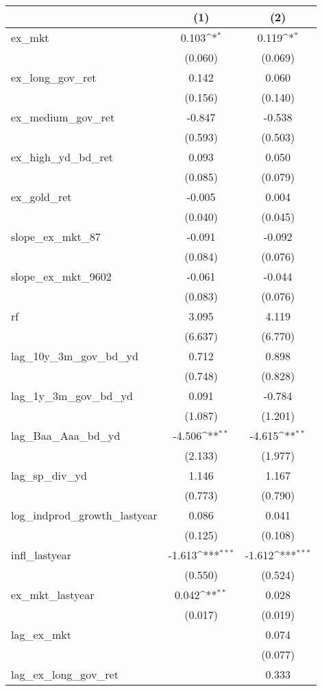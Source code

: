 {
\def\sym#1{\ifmmode^{#1}\else\(^{#1}\)\fi}
\begin{tabular}{@{\extracolsep{2pt}}l*{2}{c}@{}}
\hline\hline


 & (1) & (2) \\
\hline
ex\_mkt & 0.103\sym{*} & 0.119\sym{*} \\
 & (0.060) & (0.069) \\
ex\_long\_gov\_ret & 0.142 & 0.060 \\
 & (0.156) & (0.140) \\
ex\_medium\_gov\_ret & -0.847 & -0.538 \\
 & (0.593) & (0.503) \\
ex\_high\_yd\_bd\_ret & 0.093 & 0.050 \\
 & (0.085) & (0.079) \\
ex\_gold\_ret & -0.005 & 0.004 \\
 & (0.040) & (0.045) \\
slope\_ex\_mkt\_87 & -0.091 & -0.092 \\
 & (0.084) & (0.076) \\
slope\_ex\_mkt\_9602 & -0.061 & -0.044 \\
 & (0.083) & (0.076) \\
rf & 3.095 & 4.119 \\
 & (6.637) & (6.770) \\
lag\_10y\_3m\_gov\_bd\_yd & 0.712 & 0.898 \\
 & (0.748) & (0.828) \\
lag\_1y\_3m\_gov\_bd\_yd & 0.091 & -0.784 \\
 & (1.087) & (1.201) \\
lag\_Baa\_Aaa\_bd\_yd & -4.506\sym{**} & -4.615\sym{**} \\
 & (2.133) & (1.977) \\
lag\_sp\_div\_yd & 1.146 & 1.167 \\
 & (0.773) & (0.790) \\
log\_indprod\_growth\_lastyear & 0.086 & 0.041 \\
 & (0.125) & (0.108) \\
infl\_lastyear & -1.613\sym{***} & -1.612\sym{***} \\
 & (0.550) & (0.524) \\
ex\_mkt\_lastyear & 0.042\sym{**} & 0.028 \\
 & (0.017) & (0.019) \\
lag\_ex\_mkt &  & 0.074 \\
 &  & (0.077) \\
lag\_ex\_long\_gov\_ret &  & 0.333 \\

\end{tabular}}
